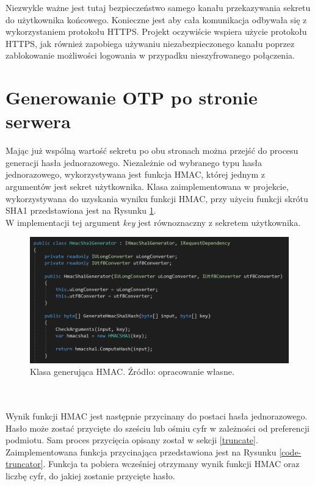 Niezwykle ważne jest tutaj bezpieczeństwo samego kanału przekazywania sekretu do użytkownika końcowego. 
Konieczne jest aby cała komunikacja odbywała się z wykorzystaniem protokołu HTTPS. 
Projekt oczywiście wspiera użycie protokołu HTTPS, jak również zapobiega używaniu niezabezpieczonego kanału 
poprzez zablokowanie możliwości logowania w przypadku nieszyfrowanego połączenia.

\section{Generowanie OTP po stronie serwera}
Mając już wspólną wartość sekretu po obu stronach można przejść do procesu generacji hasła jednorazowego.
Niezależnie od wybranego typu hasła jednorazowego, wykorzystywana jest funkcja HMAC, której jednym z argumentów
jest sekret użytkownika. Klasa zaimplementowana w projekcie, wykorzystywana do uzyskania wyniku funkcji HMAC, 
przy użyciu funkcji skrótu SHA1 przedstawiona jest na Rysunku \ref{code-hmac}. \\
W implementacji tej argument \textit{key} jest równoznaczny z sekretem użytkownika.
\begin{figure}[t]
    \centering
	\includegraphics[width=\textwidth]{content/images/code-hmac}
    \caption{Klasa generująca HMAC. Źródło: opracowanie własne.}
    \label{code-hmac}
\end{figure} \\ \\
Wynik funkcji HMAC jest następnie przycinany do postaci hasła jednorazowego. 
Hasło może zostać przycięte do sześciu lub ośmiu cyfr w zależności od preferencji podmiotu.
Sam proces przycięcia opisany został w sekcji \ref{truncate}. \\
Zaimplementowana funkcja przycinająca przedstawiona jest na Rysunku \ref{code-truncator}.
Funkcja ta pobiera wcześniej otrzymany wynik funkcji HMAC oraz liczbę cyfr, do jakiej zostanie przycięte hasło.
